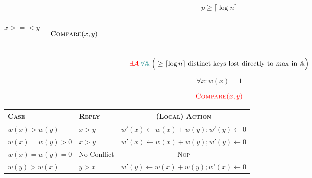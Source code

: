 \begin{frame}{}
  \[
    p \ge \lceil \log n \rceil
  \]

  \begin{columns}
      \centerline{}
      \[
	x >=< y
      \]
      \centerline{}
      \[
	\textsc{Compare}(x,y)
      \]
  \end{columns}
  
  \pause
  \vspace{0.50cm}
  \[
    \textcolor{red}{\exists \mathcal{A}}\; \textcolor{teal}{\forall \mathbb{A}}\; \Big(\ge \lceil \log n \rceil \text{ distinct keys lost directly to \textsl{max} in } \mathbb{A}\Big) 
  \]
\end{frame}

\begin{frame}{}
\end{frame}

\begin{frame}{}
  \[
    \forall x: w(x) = 1
  \]

  \[
    \textcolor{red}{\textsc{Compare}(x,y)}
  \]
  \renewcommand{\arraystretch}{1.5}
  \begin{center}
    \begin{tabular}{l l c}
      \textsc{Case} & \textsc{Reply} & \textsc{(Local) Action} \\ \hline
      $w(x) > w(y)$ 		& $x > y$	& $w'(x) \gets w(x) + w(y); w'(y) \gets 0$ \\ \hline
      $w(x) = w(y) > 0$ 	& $x > y$	& $w'(x) \gets w(x) + w(y); w'(y) \gets 0$ \\ \hline
      $w(x) = w(y) = 0$ 	& \textsf{No Conflict} & \textsc{Nop} \\ \hline
      $w(y) > w(x)$ 		& $y > x$	& $w'(y) \gets w(x) + w(y); w'(x) \gets 0$ \\ \hline
    \end{tabular}
  \end{center}

  \pause
  \vspace{0.30cm}
  \begin{CJK*}{UTF8}{gbsn}
    \centerline{}
  \end{CJK*}
\end{frame}

